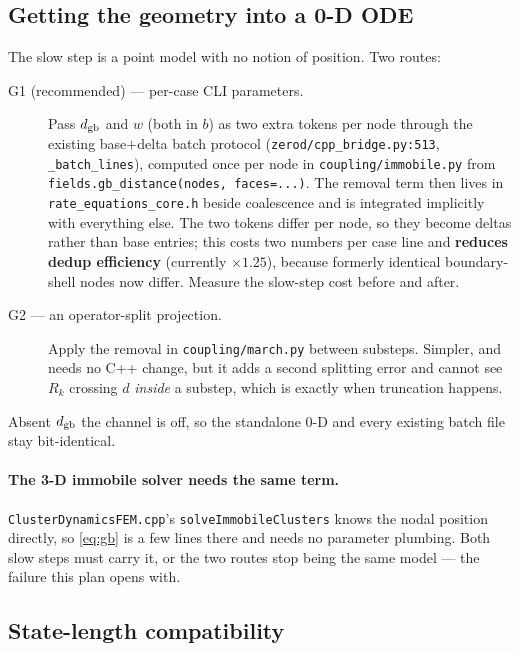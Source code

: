 \documentclass[11pt]{article}
\newcommand{\fbk}{\discretionary{}{}{}}   %
\newcommand{\file}[1]{\texttt{\small #1}}
\begin{document}
\subsection{Getting the geometry into a 0-D ODE}

The slow step is a point model with no notion of position.  Two routes:

\begin{description}
\item[G1 (recommended) --- per-case CLI parameters.]  Pass $d_{\rm gb}$ and
  $w$ (both in $b$) as two extra tokens per node through the existing
  base$+$delta batch protocol
  (\file{zerod/\fbk cpp\_\fbk bridge.\fbk py:513}, \verb|_batch_lines|),
  computed once per node in \file{coupling/\fbk immobile.\fbk py} from
  \verb|fields.gb_distance(nodes, faces=...)|.  The removal term then lives in
  \file{rate\_\fbk equations\_\fbk core.\fbk h} beside coalescence and is
  integrated implicitly with everything else.  The two tokens differ per node,
  so they become deltas rather than base entries; this costs two numbers per
  case line and \textbf{reduces dedup efficiency} (currently $\times1.25$),
  because formerly identical boundary-shell nodes now differ.  Measure the
  slow-step cost before and after.
\item[G2 --- an operator-split projection.]  Apply the removal in
  \file{coupling/\fbk march.\fbk py} between substeps.  Simpler, and needs no
  C++ change, but it adds a second splitting error and cannot see $R_k$
  crossing $d$ \emph{inside} a substep, which is exactly when truncation
  happens.
\end{description}

Absent $d_{\rm gb}$ the channel is off, so the standalone 0-D and every
existing batch file stay bit-identical.

\paragraph{The 3-D immobile solver needs the same term.}
\file{ClusterDynamicsFEM.\fbk cpp}'s \verb|solveImmobileClusters| knows the
nodal position directly, so \eqref{eq:gb} is a few lines there and needs no
parameter plumbing.  Both slow steps must carry it, or the two routes stop
being the same model --- the failure this plan opens with.

\subsection{State-length compatibility}
\end{document}
